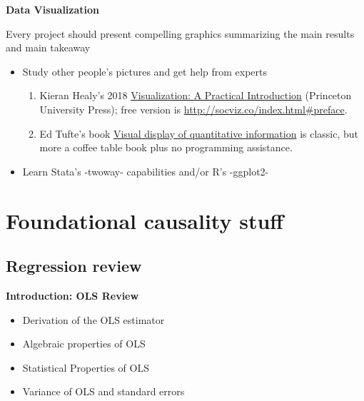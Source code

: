 \documentclass[notes=show]{beamer}
\begin{document}
\begin{frame}[plain]
\begin{center}
\textbf{Data Visualization}
\end{center}

Every project should present compelling graphics summarizing the main results and main takeaway
\begin{itemize}
\item Study other people's pictures and get help from experts
	\begin{enumerate}
	\item Kieran Healy's 2018 \underline{Visualization: A Practical Introduction} (Princeton University Press); free version is \url{http://socviz.co/index.html\#preface}. 
	\item Ed Tufte's book \underline{Visual display of quantitative information} is classic, but more a coffee table book plus no programming assistance. 
	\end{enumerate}
\item Learn Stata's -twoway- capabilities and/or R's -ggplot2-
\end{itemize}

\end{frame}

\section{Foundational causality stuff}

\subsection{Regression review}

\begin{frame}
\begin{center}
\textbf{Introduction: OLS Review}
\end{center}

\begin{itemize}
\item Derivation of the OLS estimator
\item Algebraic properties of OLS
\item Statistical Properties of OLS
\item Variance of OLS and standard errors
\end{itemize}

\end{frame}
\end{document}

